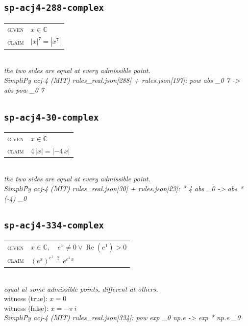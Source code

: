 \documentclass[11pt]{article}
\begin{document}
\subsection*{\texttt{sp-acj4-288-complex}}
\begin{tabular}{@{}l@{\quad}l@{}}
\textsc{given} & $x \in \mathbb{C}$ \\[4pt]
\textsc{claim} & $\displaystyle \left|x\right|^{7} = \left|x^{7}\right|$ \\
\end{tabular}\\[2pt]
{\small\emph{the two sides are equal at every admissible point.}}\\
\emph{SimpliPy acj-4 (MIT) rules\_real.json[288] + rules.json[197]: pow abs \_0 7  ->  abs pow \_0 7}\\

\subsection*{\texttt{sp-acj4-30-complex}}
\begin{tabular}{@{}l@{\quad}l@{}}
\textsc{given} & $x \in \mathbb{C}$ \\[4pt]
\textsc{claim} & $\displaystyle 4 \, \left|x\right| = \left|-4 \, x\right|$ \\
\end{tabular}\\[2pt]
{\small\emph{the two sides are equal at every admissible point.}}\\
\emph{SimpliPy acj-4 (MIT) rules\_real.json[30] + rules.json[23]: * 4 abs \_0  ->  abs * (-4) \_0}\\

\subsection*{\texttt{sp-acj4-334-complex}}
\begin{tabular}{@{}l@{\quad}l@{}}
\textsc{given} & $x \in \mathbb{C},\quad e^{x} \neq 0 \lor \operatorname{Re}\left(e^{1}\right) > 0$ \\[4pt]
\textsc{claim} & $\displaystyle \left(e^{x}\right)^{e^{1}} \overset{?}{=} e^{e^{1} \, x}$ \\
\end{tabular}\\[2pt]
{\small\emph{equal at some admissible points, different at others.}}\\
{\footnotesize\color{gray}witness (true): $x = 0$}\\
{\footnotesize\color{gray}witness (false): $x = -\pi \, i$}\\
\emph{SimpliPy acj-4 (MIT) rules\_real.json[334]: pow exp \_0 np.e  ->  exp * np.e \_0}\\
\end{document}
